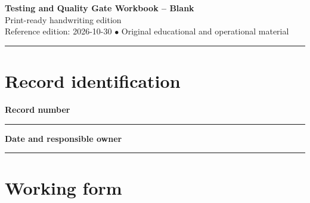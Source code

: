 \documentclass[10pt,letterpaper]{article}
\begin{document}
\begin{center}
{\LARGE\bfseries\color{cdblue}Testing and Quality Gate Workbook -- Blank}\\[7pt]
{\large Print-ready handwriting edition}\\[6pt]
{\small Reference edition: 2026-10-30 $\bullet$ Original educational and operational material}
\end{center}
\noindent\color{cdblue}\rule{\linewidth}{1.2pt}\color{black}
\vspace{0.4em}
\section{Record identification}
\textbf{Record number}\par
\noindent\rule{\linewidth}{0.35pt}\par\vspace{0.7em}
\textbf{Date and responsible owner}\par
\noindent\rule{\linewidth}{0.35pt}\par\vspace{0.7em}

\section{Working form}
\end{document}
